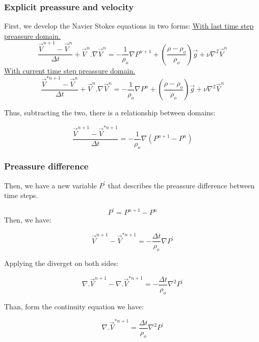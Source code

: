 \documentclass[xcolor=dvipsnames,10pt,aspectratio=169]{beamer}
\begin{document}
\begin{frame}
	\frametitle{Explicit preassure and velocity}
	\flushleft
	First, we develop the Navier Stokes equations in two forms:\vspace{0.5cm}
	\centering
	\underline{With last time step preassure domain.}
	\begin{equation}\label{equation1}
	\frac{\vec{V}^{n + 1} - \vec{V}^{n}}{\Delta t} + \vec{V}^{n} . {\nabla} \vec{V}^{n} = - \frac{1}{\rho_o}\nabla P^{n + 1} + \left( \frac{\rho - \rho_o}{\rho_o} \right) \vec{g} + \nu \nabla^2 \vec{V}^{n}
	\end{equation}
	\underline{With current time step preassure domain.}
	\begin{equation}\label{eqlabel1}
	\frac{\vec{V}^{\ast{n + 1}} - \vec{V}^{n}}{\Delta t} + \vec{V}^{n} . {\nabla} \vec{V}^{n} = - \frac{1}{\rho_o}\nabla P^{n} + \left( \frac{\rho - \rho_o}{\rho_o} \right) \vec{g} + \nu \nabla^2 \vec{V}^{n}
	\end{equation}

	Thus, subtracting the two, there is a relationship between domains:

	\begin{equation}
	\frac{\vec{V}^{{n + 1}} - \vec{V}^{{\ast n+1} }}{\Delta t} = - \frac{1}{\rho_o}\nabla \left( P^{n+1} - P ^n\right)
	\end{equation}
\end{frame}

\begin{frame}
	\frametitle{Preassure difference}
	\flushleft
	Then, we have a new variable $ P^\prime $ that describes the preassure difference between time steps.

	\begin{equation}
	P^\prime = P^{n + 1} - P^n
	\end{equation}
	Then, we have:

	\begin{equation}\label{eqlabel3}
	\vec{V}^{n+1} - \vec{V}^{\ast{n + 1}} = - \frac{\Delta t}{\rho_o} \nabla P^\prime
	\end{equation}

	Applying the diverget on both sides:

	\begin{equation}
	\nabla . \vec{V}^{n+1} - \nabla .\vec{V}^{\ast{n + 1}} = - \frac{\Delta t}{\rho_o} \nabla^2 P^\prime
	\end{equation}

	Than, form the continuity equation we have:

	\begin{equation}\label{eqlabel2}
	\nabla .\vec{V}^{\ast{n + 1}} = \frac{\Delta t}{\rho_o} \nabla^2 P^\prime
	\end{equation}
\end{frame}
\end{document}
